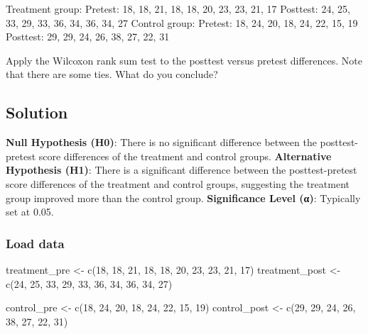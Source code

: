\documentclass[
]{article}
\newenvironment{Shaded}{\begin{snugshade}}{\end{snugshade}}
\newcommand{\DecValTok}[1]{\textcolor[rgb]{0.00,0.00,0.81}{#1}}
\newcommand{\FunctionTok}[1]{\textcolor[rgb]{0.00,0.00,0.00}{#1}}
\newcommand{\NormalTok}[1]{#1}
\newcommand{\OtherTok}[1]{\textcolor[rgb]{0.56,0.35,0.01}{#1}}
\begin{document}
Treatment group: Pretest: 18, 18, 21, 18, 18, 20, 23, 23, 21, 17
Posttest: 24, 25, 33, 29, 33, 36, 34, 36, 34, 27 Control group: Pretest:
18, 24, 20, 18, 24, 22, 15, 19 Posttest: 29, 29, 24, 26, 38, 27, 22, 31

Apply the Wilcoxon rank sum test to the posttest versus pretest
differences. Note that there are some ties. What do you conclude?

\hypertarget{solution-5}{%
\subsection{Solution}\label{solution-5}}

\textbf{Null Hypothesis (H0)}: There is no significant difference
between the posttest-pretest score differences of the treatment and
control groups. \textbf{Alternative Hypothesis (H1)}: There is a
significant difference between the posttest-pretest score differences of
the treatment and control groups, suggesting the treatment group
improved more than the control group. \textbf{Significance Level (α)}:
Typically set at 0.05.

\hypertarget{load-data-5}{%
\subsubsection{Load data}\label{load-data-5}}

\begin{Shaded}
\begin{Highlighting}[]
\NormalTok{treatment\_pre }\OtherTok{\textless{}{-}} \FunctionTok{c}\NormalTok{(}\DecValTok{18}\NormalTok{, }\DecValTok{18}\NormalTok{, }\DecValTok{21}\NormalTok{, }\DecValTok{18}\NormalTok{, }\DecValTok{18}\NormalTok{, }\DecValTok{20}\NormalTok{, }\DecValTok{23}\NormalTok{, }\DecValTok{23}\NormalTok{, }\DecValTok{21}\NormalTok{, }\DecValTok{17}\NormalTok{)}
\NormalTok{treatment\_post }\OtherTok{\textless{}{-}} \FunctionTok{c}\NormalTok{(}\DecValTok{24}\NormalTok{, }\DecValTok{25}\NormalTok{, }\DecValTok{33}\NormalTok{, }\DecValTok{29}\NormalTok{, }\DecValTok{33}\NormalTok{, }\DecValTok{36}\NormalTok{, }\DecValTok{34}\NormalTok{, }\DecValTok{36}\NormalTok{, }\DecValTok{34}\NormalTok{, }\DecValTok{27}\NormalTok{)}

\NormalTok{control\_pre }\OtherTok{\textless{}{-}} \FunctionTok{c}\NormalTok{(}\DecValTok{18}\NormalTok{, }\DecValTok{24}\NormalTok{, }\DecValTok{20}\NormalTok{, }\DecValTok{18}\NormalTok{, }\DecValTok{24}\NormalTok{, }\DecValTok{22}\NormalTok{, }\DecValTok{15}\NormalTok{, }\DecValTok{19}\NormalTok{)}
\NormalTok{control\_post }\OtherTok{\textless{}{-}} \FunctionTok{c}\NormalTok{(}\DecValTok{29}\NormalTok{, }\DecValTok{29}\NormalTok{, }\DecValTok{24}\NormalTok{, }\DecValTok{26}\NormalTok{, }\DecValTok{38}\NormalTok{, }\DecValTok{27}\NormalTok{, }\DecValTok{22}\NormalTok{, }\DecValTok{31}\NormalTok{)}
\end{Highlighting}
\end{Shaded}
\end{document}
